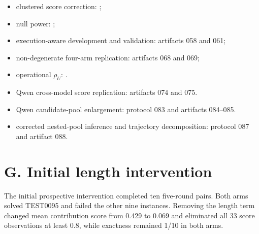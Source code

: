 \documentclass{article}
\begin{document}
\begin{itemize}
  \item clustered score correction: \texttt{};
  \item null power: \texttt{};
  \item execution-aware development and validation: artifacts 058 and 061;
  \item non-degenerate four-arm replication: artifacts 068 and 069;
  \item operational \(\rho_U\): \texttt{}.
  \item Qwen cross-model score replication: artifacts 074 and 075.
  \item Qwen candidate-pool enlargement: protocol 083 and artifacts 084--085.
  \item corrected nested-pool inference and trajectory decomposition: protocol 087 and artifact 088.
\end{itemize}

\section{G. Initial length intervention}

The initial prospective intervention completed ten five-round pairs. Both arms solved TEST0095 and failed the other nine instances. Removing the length term changed mean contribution score from 0.429 to 0.069 and eliminated all 33 score observations at least 0.8, while exactness remained 1/10 in both arms.

\begin{center}
\end{center}
\end{document}

